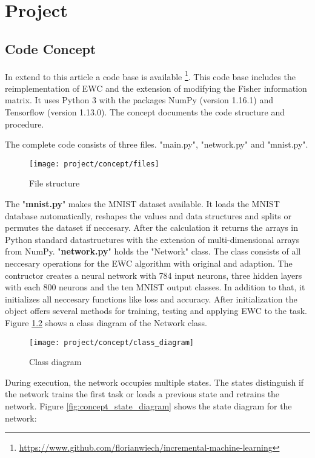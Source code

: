\chapter{Project}

\section{Code Concept}

In extend to this article a code base is available \footnote{\url{https://www.github.com/florianwiech/incremental-machine-learning}}.
This code base includes the reimplementation of EWC and the extension of modifying the Fisher information matrix.
It uses Python 3 with the packages NumPy (version 1.16.1) and Tensorflow (version 1.13.0).
The concept documents the code structure and procedure.

The complete code consists of three files.
"main.py", "network.py" and "mnist.py".

\begin{figure}[H]
    \centering
    \texttt{[image: project/concept/files]}
    \caption{File structure}
    \label{fig:concept_file_structure}
\end{figure}

The "\textbf{mnist.py}" makes the MNIST dataset available.
It loads the MNIST database automatically, reshapes the values and data structures and splits or permutes the dataset if neccesary.
After the calculation it returns the arrays in Python standard datastructures with the extension of multi-dimensional arrays from NumPy.
\newline
"\textbf{network.py}" holds the "Network" class.
The class consists of all neccesary operations for the EWC algorithm with original and adaption.
The contructor creates a neural network with 784 input neurons, three hidden layers with each 800 neurons and the ten MNIST output classes.
In addition to that, it initializes all neccesary functions like loss and accuracy.
After initialization the object offers several methods for training, testing and applying EWC to the task.
Figure \ref{fig:concept_class_diagram} shows a class diagram of the Network class.

\begin{figure}[H]
    \centering
    \texttt{[image: project/concept/class\_diagram]}
    \caption{Class diagram}
    \label{fig:concept_class_diagram}
\end{figure}

During execution, the network occupies multiple states.
The states distinguish if the network trains the first task or loads a previous state and retrains the network.
Figure \ref{fig:concept_state_diagram} shows the state diagram for the network:

